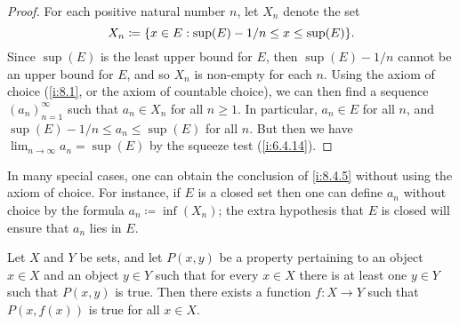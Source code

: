 \begin{proof}
  For each positive natural number \(n\), let \(X_n\) denote the set
  \[
    X_n \coloneqq \set{x \in E : \sup(E) - 1 / n \leq x \leq \sup(E)}.
  \]
  Since \(\sup(E)\) is the least upper bound for \(E\), then \(\sup(E) - 1 / n\) cannot be an upper bound for \(E\), and so \(X_n\) is non-empty for each \(n\).
  Using the axiom of choice (\cref{i:8.1}, or the axiom of countable choice), we can then find a sequence \((a_n)_{n = 1}^\infty\) such that \(a_n \in X_n\) for all \(n \geq 1\).
  In particular, \(a_n \in E\) for all \(n\), and \(\sup(E) - 1 / n \leq a_n \leq \sup(E)\) for all \(n\).
  But then we have \(\lim_{n \to \infty} a_n = \sup(E)\) by the squeeze test (\cref{i:6.4.14}).
\end{proof}

\begin{rmk}\label{i:8.4.6}
  In many special cases, one can obtain the conclusion of \cref{i:8.4.5} without using the axiom of choice.
  For instance, if \(E\) is a closed set then one can define \(a_n\) without choice by the formula \(a_n \coloneqq \inf(X_n)\);
  the extra hypothesis that \(E\) is closed will ensure that \(a_n\) lies in \(E\).
\end{rmk}

\begin{prop}\label{i:8.4.7}
  Let \(X\) and \(Y\) be sets, and let \(P(x, y)\) be a property pertaining to an object \(x \in X\) and an object \(y \in Y\) such that for every \(x \in X\) there is at least one \(y \in Y\) such that \(P(x, y)\) is true.
  Then there exists a function \(f : X \to Y\) such that \(P(x, f(x))\) is true for all \(x \in X\).
\end{prop}

